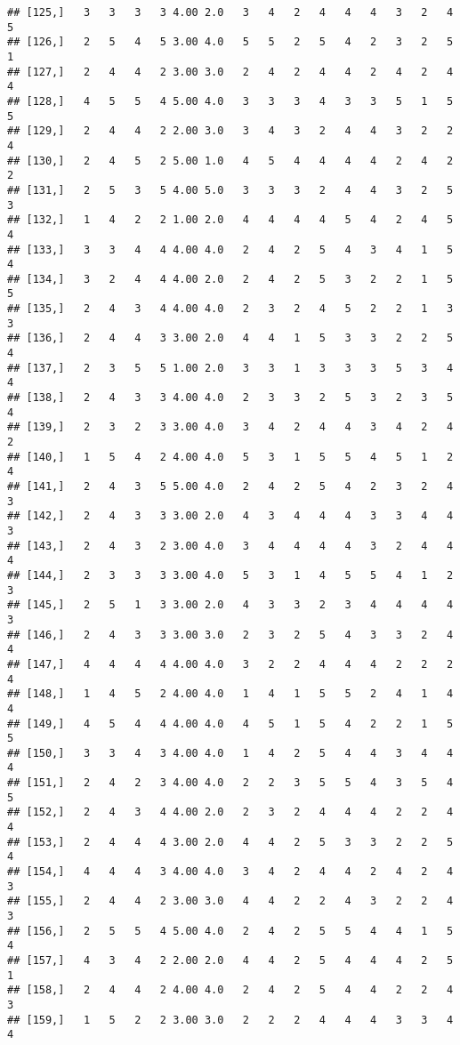 \documentclass[]{article}
\begin{document}
\begin{verbatim}
## [125,]   3   3   3   3 4.00 2.0   3   4   2   4   4   4   3   2   4   5
## [126,]   2   5   4   5 3.00 4.0   5   5   2   5   4   2   3   2   5   1
## [127,]   2   4   4   2 3.00 3.0   2   4   2   4   4   2   4   2   4   4
## [128,]   4   5   5   4 5.00 4.0   3   3   3   4   3   3   5   1   5   5
## [129,]   2   4   4   2 2.00 3.0   3   4   3   2   4   4   3   2   2   4
## [130,]   2   4   5   2 5.00 1.0   4   5   4   4   4   4   2   4   2   2
## [131,]   2   5   3   5 4.00 5.0   3   3   3   2   4   4   3   2   5   3
## [132,]   1   4   2   2 1.00 2.0   4   4   4   4   5   4   2   4   5   4
## [133,]   3   3   4   4 4.00 4.0   2   4   2   5   4   3   4   1   5   4
## [134,]   3   2   4   4 4.00 2.0   2   4   2   5   3   2   2   1   5   5
## [135,]   2   4   3   4 4.00 4.0   2   3   2   4   5   2   2   1   3   3
## [136,]   2   4   4   3 3.00 2.0   4   4   1   5   3   3   2   2   5   4
## [137,]   2   3   5   5 1.00 2.0   3   3   1   3   3   3   5   3   4   4
## [138,]   2   4   3   3 4.00 4.0   2   3   3   2   5   3   2   3   5   4
## [139,]   2   3   2   3 3.00 4.0   3   4   2   4   4   3   4   2   4   2
## [140,]   1   5   4   2 4.00 4.0   5   3   1   5   5   4   5   1   2   4
## [141,]   2   4   3   5 5.00 4.0   2   4   2   5   4   2   3   2   4   3
## [142,]   2   4   3   3 3.00 2.0   4   3   4   4   4   3   3   4   4   3
## [143,]   2   4   3   2 3.00 4.0   3   4   4   4   4   3   2   4   4   4
## [144,]   2   3   3   3 3.00 4.0   5   3   1   4   5   5   4   1   2   3
## [145,]   2   5   1   3 3.00 2.0   4   3   3   2   3   4   4   4   4   3
## [146,]   2   4   3   3 3.00 3.0   2   3   2   5   4   3   3   2   4   4
## [147,]   4   4   4   4 4.00 4.0   3   2   2   4   4   4   2   2   2   4
## [148,]   1   4   5   2 4.00 4.0   1   4   1   5   5   2   4   1   4   4
## [149,]   4   5   4   4 4.00 4.0   4   5   1   5   4   2   2   1   5   5
## [150,]   3   3   4   3 4.00 4.0   1   4   2   5   4   4   3   4   4   4
## [151,]   2   4   2   3 4.00 4.0   2   2   3   5   5   4   3   5   4   5
## [152,]   2   4   3   4 4.00 2.0   2   3   2   4   4   4   2   2   4   4
## [153,]   2   4   4   4 3.00 2.0   4   4   2   5   3   3   2   2   5   4
## [154,]   4   4   4   3 4.00 4.0   3   4   2   4   4   2   4   2   4   3
## [155,]   2   4   4   2 3.00 3.0   4   4   2   2   4   3   2   2   4   3
## [156,]   2   5   5   4 5.00 4.0   2   4   2   5   5   4   4   1   5   4
## [157,]   4   3   4   2 2.00 2.0   4   4   2   5   4   4   4   2   5   1
## [158,]   2   4   4   2 4.00 4.0   2   4   2   5   4   4   2   2   4   3
## [159,]   1   5   2   2 3.00 3.0   2   2   2   4   4   4   3   3   4   4

\end{verbatim}
\end{document}
